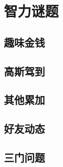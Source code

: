 \section{智力谜题}\label{sec:section1.4}

\subsection{趣味金钱}

\subsection{高斯驾到}

\subsection{其他累加}

\subsection{好友动态}

\subsection{三门问题}

